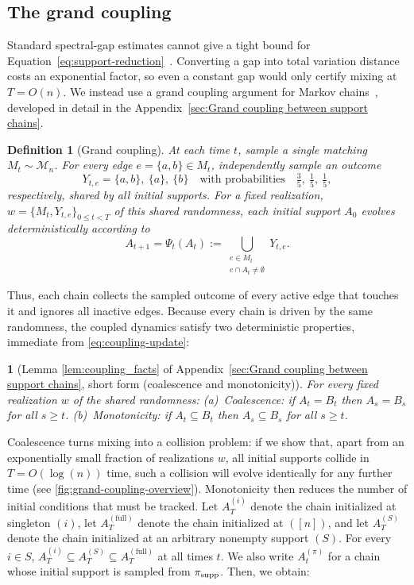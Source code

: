 \documentclass[
    aps,
    superscriptaddress,
    onecolumn,
    10pt,
    prx,
    nofootinbib
]{revtex4-2}
\newtheorem{definition}{Definition}
\theoremstyle{namedstatement}
\newtheorem*{namedstatementInner}{}
\theoremstyle{plain}
\newenvironment{restatement}[1]{%
    \begin{namedstatementInner}[#1]%
}{%
    \end{namedstatementInner}%
}
\begin{document}
\subsection{The grand coupling}\label{sec:methods-coupling}

Standard spectral-gap estimates cannot give a tight bound for Equation~\eqref{eq:support-reduction}~\cite{LevinPeresWilmer2017}. Converting a gap into total variation distance costs an exponential factor, so even a constant gap would only certify mixing at $T=O(n)$. We instead use a grand coupling argument for Markov chains~\cite{LevinPeresWilmer2017}, developed in detail in the Appendix~\ref{sec:Grand coupling between support chains}.

\begin{definition}[Grand coupling]\label{def:grand-coupling}
At each time $t$, sample a single matching $M_{t}\sim\mathcal{M}_n$. For every edge
$e=\{a,b\}\in M_{t}$, independently sample an outcome
\begin{equation}\label{eq:coupling-outcomes}
 Y_{t,e}=\{a,b\},\ \{a\},\ \{b\}
 \quad\text{with probabilities}\quad
 \tfrac35,\ \tfrac15,\ \tfrac15,
\end{equation}
respectively, shared by all initial supports. For a fixed realization, $w=\{M_t,Y_{t,e}\}_{0\leq t < T}$ of this shared randomness, each initial support $A_0$ evolves deterministically according to
\begin{equation}\label{eq:coupling-update}
 A_{t+1}=\Psi_{t}(A_{t})
 :=\bigcup_{\substack{e\in M_{t}\\ e\cap A_{t}\neq\emptyset}}Y_{t,e}.
\end{equation}
\end{definition}
Thus, each chain collects the sampled outcome of every active edge that touches it and ignores all inactive edges. Because every chain is driven by the same randomness, the coupled dynamics satisfy two deterministic properties, immediate
from \cref{eq:coupling-update}:

\begin{restatement}{Lemma \ref{lem:coupling_facts} of Appendix~\ref{sec:Grand coupling between support chains}, short form (coalescence and monotonicity)}
For every fixed realization $w$ of the shared randomness:
(a)~Coalescence: if $A_{t}=B_{t}$ then $A_{s}=B_{s}$ for all $s\geq t$.
(b)~Monotonicity: if $A_{t}\subseteq B_{t}$ then $A_{s}\subseteq B_{s}$ for all $s\geq t$.
\end{restatement}
Coalescence turns mixing into a collision problem: if we show that, apart from an exponentially small fraction of realizations $w$, all initial supports collide in $T=O(\log(n))$ time, such a collision will evolve identically for any further time (see \cref{fig:grand-coupling-overview}). Monotonicity then reduces the number of initial conditions that must be tracked. Let $A_{T}^{(i)}$ denote the chain initialized at singleton $(i)$, let $A_{T}^{(\mathrm{full})}$ denote the chain initialized at $([n])$, and let $A_{T}^{(S)}$ denote the chain initialized at an arbitrary nonempty support $(S)$. For every $i\in S$,  $A_{T}^{(i)}\subseteq A_{T}^{(S)}\subseteq A_{T}^{(\mathrm{full})}$ at all times $t$. We also write $A_t^{(\pi)}$ for a chain whose initial support is sampled from $\pi_{\rm supp}$. Then, we obtain:
\end{document}
